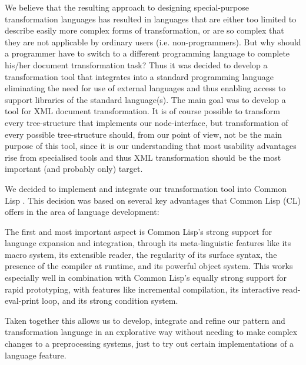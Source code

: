 \documentclass[a4paper,11pt]{scrartcl}
\begin{document}
We believe that the resulting approach to designing special-purpose
transformation languages has resulted in languages that are either too
limited to describe easily more complex forms of transformation, or
are so
%
%
%
complex that they are not applicable by ordinary users (i.e.
non-programmers). But why should a programmer have to switch to a
different programming language to complete his/her document
transformation task? Thus it was decided to develop a transformation
tool that integrates into a standard programming language eliminating
the need for use of external languages and thus enabling access to
support libraries of the standard language(s). The main goal was to
develop a tool for XML document transformation. It is of course
possible to transform every tree-structure that implements our
node-interface, but transformation of every possible tree-structure
should, from our point of view, not be the main purpose of this tool,
since it is our understanding that most usability advantages rise from
specialised tools and thus XML transformation should be the most
important (and probably only) target.

We decided to implement and integrate our transformation tool into
Common Lisp \cite{ANSI}. This decision was based on several key
advantages that Common Lisp (CL) offers in the area of language
development:

The first and most important aspect is Common Lisp's strong support
for language expansion and integration, through its meta-linguistic
features like its macro system, its extensible reader, the regularity
of its surface syntax, the presence of the compiler at runtime, and
its powerful object system.  This works especially well in combination
with Common Lisp's equally strong support for rapid prototyping, with
features like incremental compilation, its interactive read-eval-print
loop, and its strong condition system.

Taken together this allows us to develop, integrate and refine our
pattern and transformation language in an explorative way without
needing to make complex changes to a preprocessing systems, just to
try out certain implementations of a language feature.
\end{document}
